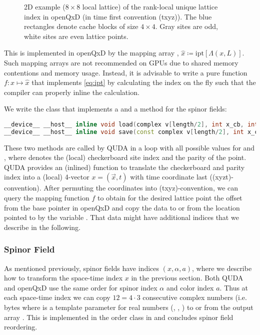 \begin{figure}
  \caption{2D example ($8 \times 8$ local lattice) of the rank-local unique lattice index in openQxD (in time first convention (txyz)). The blue rectangles denote cache blocks of size $4 \times 4$. Gray sites are odd, white sites are even lattice points.}
  \label{fig:index}
\end{figure}

This is implemented in openQxD by the mapping array , $\hat{x} \coloneqq \text{ipt}\left[\Lambda(x,L)\right]$. Such mapping arrays are not recommended on GPUs due to shared memory contentions and memory usage. Instead, it is advisable to write a pure function $f \colon x \mapsto \hat{x}$ that implements \cref{eq:ipt} by calculating the index on the fly such that the compiler can properly inline the calculation.

We write the  class that implements a  and a  method for the spinor fields:

\begin{lstlisting}[language=C++]
__device__ __host__ inline void load(complex v[length/2], int x_cb, int parity = 0)
__device__ __host__ inline void save(const complex v[length/2], int x_cb, int parity = 0) const
\end{lstlisting}

These two methods are called by QUDA in a loop with all possible values for  and , where  denotes the (local) checkerboard site index and  the parity of the point. QUDA provides an (inlined) function  to translate the checkerboard and parity index into a (local) 4-vector $x = (\vec{x}, t)$ with time coordinate last ((xyzt)-convention). After permuting the coordinates into (txyz)-convention, we can query the mapping function $f$ to obtain for the desired lattice point the offset from the base pointer in openQxD and copy the data to or from the location pointed to by the variable . That data might have additional indices that we describe in the
following.

\subsubsection{Spinor Field}

As mentioned previously, spinor fields have indices $(x,\alpha,a)$, where we describe how to transform the space-time index $x$ in the previous section. Both QUDA and openQxD use the same order for spinor index $\alpha$ and color index $a$. Thus at each space-time index we can copy $12=4 \cdot 3$ consecutive complex numbers (i.e.  bytes where  is a template parameter for real numbers (, , ) to or from the output array . This is implemented in the order class  in  \cite{QUDApaper} and concludes spinor field reordering.

